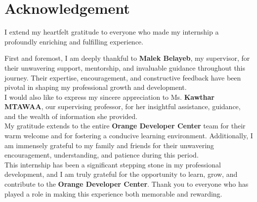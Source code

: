 \chapter*{Acknowledgement}

I extend my heartfelt gratitude to everyone who made my internship a profoundly enriching and fulfilling experience.

First and foremost, I am deeply thankful to \textbf{Malek Belayeb}, my supervisor, for their unwavering support,
mentorship, and invaluable guidance throughout this journey. Their expertise, encouragement,
and constructive feedback have been pivotal in shaping my professional growth and development.\\

I would also like to express my sincere appreciation to Ms. \textbf{Kawthar MTAWAA}, our supervising
professor, for her insightful assistance, guidance, and the wealth of information she provided.\\

My gratitude extends to the entire \textbf{Orange Developer Center} team for their warm welcome and for
fostering a conducive learning environment. Additionally, I am immensely grateful to my family and friends
for their unwavering encouragement, understanding, and patience during this period.\\

This internship has been a significant stepping stone in my professional development, and I am truly grateful
for the opportunity to learn, grow, and contribute to the \textbf{Orange Developer Center}. Thank you to everyone
who has played a role in making this experience both memorable and rewarding.